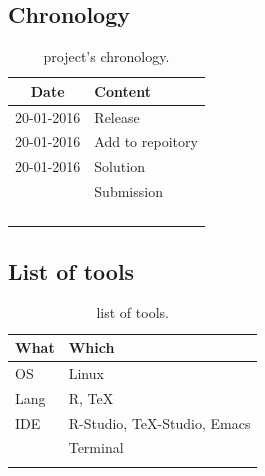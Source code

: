 \documentclass[a4paper,12pt,titlepage]{article} %
\begin{document}
\subsection{Chronology}
\begin{longtable}{|c|p{13cm}|}
	\hline
	Date & Content\\
	\hline
	20-01-2016 & Release\\
	\hline
	20-01-2016 & Add to repoitory\\
	\hline
	20-01-2016 & Solution\\
	\hline
	& Submission\\
	\hline
	& \\
	\hline
	& \\
	\hline
	& \\
	\hline
	\caption{project's chronology.}
\end{longtable}

\subsection{List of tools}
\begin{table}[h]
	\begin{tabularx}{\textwidth}{|l|X|}
		\hline
		What & Which \\
		\hline
		OS & Linux \\
		\hline
		Lang & R, \TeX \\
		\hline
		IDE & R-Studio, \TeX-Studio, Emacs\\
		\hline
		& Terminal\\
		\hline
		& \\
		\hline
	\end{tabularx}
	\caption{list of tools.}
\end{table}

\end{document}
